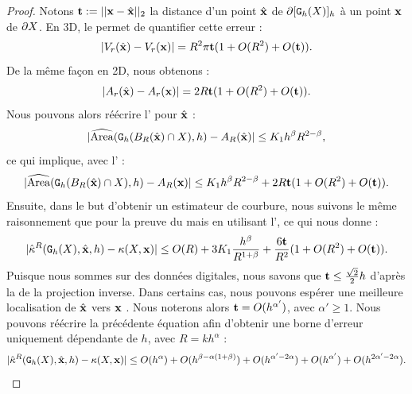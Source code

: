 \begin{proof}
%
Notons $\vt \EqDef ||\vx-\vxH||_2$ la distance d'un point $\vxH$ de
$\Bd{\Body{\DSh}{h}}$ à un point $\vx$ de $\dS$. En 3D, le
 permet de quantifier cette erreur :
%
\begin{equation}\label{eq:volume-shift-error}
  | V_r(\vxH) - V_r(\vx) | = R^2 \pi \vt (1 + O(R^2)+O(\vt)).
\end{equation}
%
De la même façon en 2D, nous obtenons :
%
\begin{equation}\label{eq:area-shift-error}
  | A_r(\vxH) - A_r(\vx) | = 2R \vt (1 + O(R^2)+O(\vt)).
\end{equation}
%
Nous pouvons alors réécrire l'
pour $\vxH$ :
%
\begin{equation}
  | \AreaC(\DigF{\Ball{R}{\vxH} \cap \Shape}{h}, h) - A_R(\vxH) | \le K_1 h^\beta R^{2-\beta},
\end{equation}
%
ce qui implique, avec l' :
%
\begin{equation}\label{eq:shift-B-R-error-bound-2D}
  | \AreaC(\DigF{\Ball{R}{\vxH} \cap \Shape}{h}, h) - A_R(\vx) |  \le K_1 h^\beta R^{2-\beta} +  2 R \vt (1 + O(R^2) + O(\vt)).
\end{equation}
%
Ensuite, dans le but d'obtenir un estimateur de courbure, nous suivons le même
raisonnement que pour la preuve du  mais en
utilisant l', ce qui nous donne :
%
\begin{equation}\label{eq:shift-curvhat-error-bound-2D}
  | \CurvH{R}(\DSh,\vxH,h) - \Curv(\Shape,\vx) | \le O(R) + 3 K_1 \frac{h^\beta}{R^{1+\beta}} + \frac{6 \vt}{R^2}(1 + O(R^2) + O(\vt)).
\end{equation}
%
Puisque nous sommes sur des données digitales, nous savons que $\vt \le
\frac{\sqrt{2}}{2}h$ d'après la  de la projection
inverse. Dans certains cas, nous pouvons espérer une meilleure localisation de
$\vxH$ vers $\vx$ \cite{deVieilleville2006}. Nous noterons alors $\vt =
O(h^{\alpha'})$, avec $\alpha' \ge 1$. Nous pouvons réécrire la précédente
équation afin d'obtenir une borne d'erreur uniquement dépendante de $h$, avec
$R=kh^{\alpha}$ :
%
\begin{equation} \label{eq:shift-curvhat-error-bound-h-only}
  | \CurvH{R}(\DSh,\vxH,h) - \Curv(\Shape,\vx) |
  \le O(h^\alpha) + O(h^{\beta-\alpha(1+\beta)}) + O(h^{\alpha'-2\alpha})
    + O(h^{\alpha'}) + O(h^{2\alpha'-2\alpha}).

\end{equation}
\end{proof}

